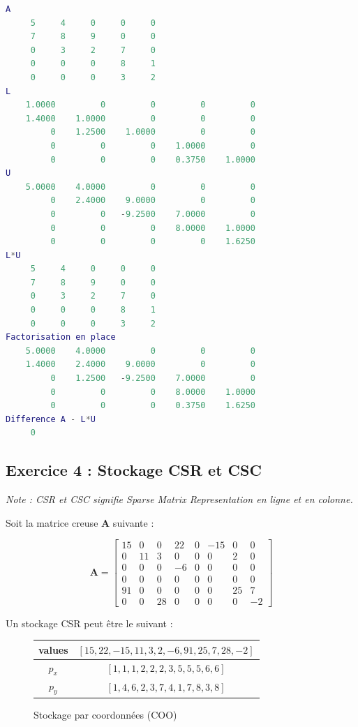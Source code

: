 \documentclass[12pt]{report}
\begin{document}
\begin{lstlisting}[language=Matlab, caption=Exemple de factorisation trigonale]
A
     5     4     0     0     0
     7     8     9     0     0
     0     3     2     7     0
     0     0     0     8     1
     0     0     0     3     2
L
    1.0000         0         0         0         0
    1.4000    1.0000         0         0         0
         0    1.2500    1.0000         0         0
         0         0         0    1.0000         0
         0         0         0    0.3750    1.0000
U
    5.0000    4.0000         0         0         0
         0    2.4000    9.0000         0         0
         0         0   -9.2500    7.0000         0
         0         0         0    8.0000    1.0000
         0         0         0         0    1.6250
L*U
     5     4     0     0     0
     7     8     9     0     0
     0     3     2     7     0
     0     0     0     8     1
     0     0     0     3     2
Factorisation en place
    5.0000    4.0000         0         0         0
    1.4000    2.4000    9.0000         0         0
         0    1.2500   -9.2500    7.0000         0
         0         0         0    8.0000    1.0000
         0         0         0    0.3750    1.6250
Difference A - L*U
     0
\end{lstlisting}


\subsection{Exercice 4 : Stockage CSR et CSC}
\textit{Note : CSR et CSC signifie Sparse Matrix Representation en ligne et en colonne.}

Soit la matrice creuse $\mathbf{A}$ suivante :

\begin{equation}\mathbf{A} = \begin{bmatrix}
15& 0& 0& 22 &0 &-15& 0& 0\\
0& 11& 3 &0 &0 &0 &2 &0\\
0 &0 &0& -6 &0 &0 &0 &0\\
0 &0 &0 &0 &0 &0& 0& 0\\
91& 0& 0& 0& 0& 0& 25& 7\\
0& 0& 28& 0& 0& 0& 0& -2
\end{bmatrix}
\end{equation}

Un stockage CSR peut être le suivant : 

\begin{figure}[H]
\centering
\begin{tabular}{|c|c|}
\hline
values		&   $\left[ 15, 22, -15, 11, 3, 2, -6, 91, 25, 7, 28, -2\right]$ \\ \hline
$p_x$ &  $\left[ 1, 1, 1, 2, 2, 2, 3, 5, 5, 5, 6, 6 \right]$  \\  \hline
$p_y$ &$\left[ 1, 4, 6, 2, 3, 7, 4, 1, 7, 8, 3, 8\right]$ \\  \hline
\end{tabular}
\caption{Stockage par coordonnées (COO)}
\end{figure}
\end{document}
